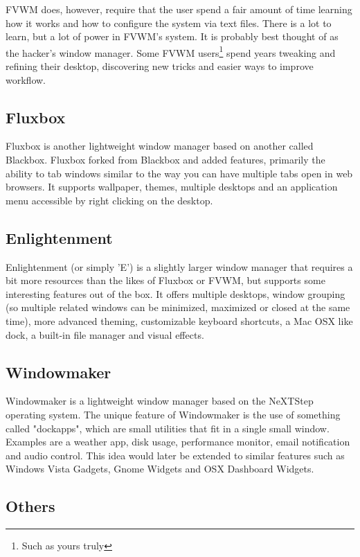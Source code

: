 FVWM does, however, require that the user spend a fair amount of time learning how it works and how to configure the system via text files.  There is a lot to learn, but a lot of power in FVWM's system.  It is probably best thought of as the hacker's window manager.  Some FVWM users\footnote{Such as yours truly} spend years tweaking and refining their desktop, discovering new tricks and easier ways to improve workflow.

\subsection{Fluxbox}

Fluxbox is another lightweight window manager based on another called Blackbox.  Fluxbox forked from Blackbox and added features, primarily the ability to tab windows similar to the way you can have multiple tabs open in web browsers.  It supports wallpaper, themes, multiple desktops and an application menu accessible by right clicking on the desktop.

\subsection{Enlightenment}

Enlightenment (or simply 'E') is a slightly larger window manager that requires a bit more resources than the likes of Fluxbox or FVWM, but supports some interesting features out of the box.  It offers multiple desktops, window grouping (so multiple related windows can be minimized, maximized or closed at the same time), more advanced theming, customizable keyboard shortcuts, a Mac OSX like dock, a built-in file manager and visual effects.

\subsection{Windowmaker}

Windowmaker is a lightweight window manager based on the NeXTStep operating system.  The unique feature of Windowmaker is the use of something called "dockapps", which are small utilities that fit in a single small window.  Examples are a weather app, disk usage, performance monitor, email notification and audio control.  This idea would later be extended to similar features such as Windows Vista Gadgets, Gnome Widgets and OSX Dashboard Widgets.

\subsection{Others}

